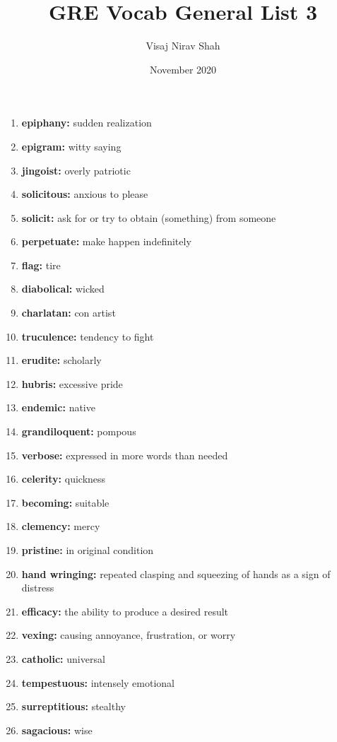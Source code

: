 \documentclass{article}
\title{\textbf{GRE Vocab General List 3}}
\author{Visaj Nirav Shah}
\date{November 2020}
\begin{document}
\maketitle

\begin{enumerate}
    \item \textbf{epiphany: }{sudden realization}
    \item \textbf{epigram: }{witty saying}
    \item \textbf{jingoist: }{overly patriotic}
    \item \textbf{solicitous: }{anxious to please}
    \item \textbf{solicit: }{ask for or try to obtain (something) from someone}
    \item \textbf{perpetuate: }{make happen indefinitely}
    \item \textbf{flag: }{tire}
    \item \textbf{diabolical: }{wicked}
    \item \textbf{charlatan: }{con artist}
    \item \textbf{truculence: }{tendency to fight}
    \item \textbf{erudite: }{scholarly}
    \item \textbf{hubris: }{excessive pride}
    \item \textbf{endemic: }{native}
    \item \textbf{grandiloquent: }{pompous}
    \item \textbf{verbose: }{expressed in more words than needed}
    \item \textbf{celerity: }{quickness}
    \item \textbf{becoming: }{suitable}
    \item \textbf{clemency: }{mercy}
    \item \textbf{pristine: }{in original condition}
    \item \textbf{hand wringing: }{repeated clasping and squeezing of hands as a sign of distress}
    \item \textbf{efficacy: }{the ability to produce a desired result}
    \item \textbf{vexing: }{causing annoyance, frustration, or worry}
    \item \textbf{catholic: }{universal}
    \item \textbf{tempestuous: }{intensely emotional}
    \item \textbf{surreptitious: }{stealthy}
    \item \textbf{sagacious: }{wise}

\end{enumerate}
\end{document}
